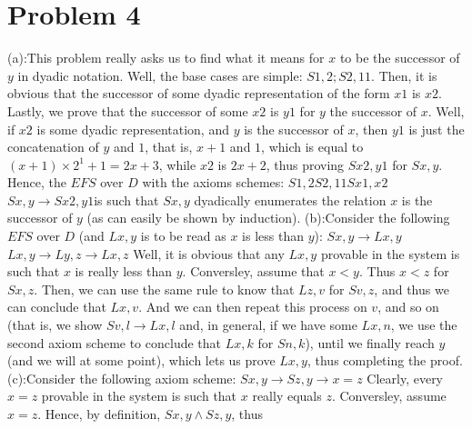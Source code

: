 \documentclass{article}
\theoremstyle{definition}
\begin{document}
\section*{Problem 4}
(a):\newline This problem really asks us to find what it means for $x$ to be the successor of $y$ in dyadic notation. Well, the base cases are simple: 
$S 1,2; S 2,11$. Then, it is obvious that the successor of some dyadic representation of the form $x1$ is $x2$. Lastly, we prove that the successor of 
some $x2$ is $y1$ for $y$ the successor of $x$. Well, if $x2$ is some dyadic representation, and $y$ is the successor of $x$, then $y1$ is just the 
concatenation of $y$ and $1$, that is, $x+1$ and $1$, which is equal to $(x+1)\times 2^1+1=2x+3$, while $x2$ is $2x+2$, thus proving $S x2, y1$ for 
$S x,y$. Hence, the $EFS$ over $D$ with the axioms schemes:\newline
$S1,2$\newline $S2,11$\newline $Sx1,x2$\newline $Sx,y\rightarrow Sx2,y1$\newline is such that $Sx,y$ dyadically enumerates the relation $x$ is the successor 
of $y$
(as can easily be shown by induction).
\newline (b):\newline Consider the following $EFS$ over $D$ (and $Lx,y$ is to be read as $x$ is less than $y$):\newline 
$Sx,y\rightarrow Lx,y$\newline $Lx,y\rightarrow Ly,z\rightarrow Lx,z$\newline
Well, it is obvious that any $Lx,y$ provable in the system is such that $x$ is really less than $y$. Conversley, assume that $x<y$. Thus $x<z$ for $Sx,z$.
Then, we can use the same rule to know that $Lz,v$ for $Sv,z$, and thus we can conclude that $Lx,v$. And we can then repeat this process on $v$, and so on
(that is, we show $Sv,l\rightarrow Lx,l$ and, in general, if we have some $Lx,n$, we use the second axiom scheme to conclude that $Lx,k$ for $Sn,k$),
until we finally reach $y$ (and we will at some point), which lets us prove $Lx,y$, thus completing the proof.\newline
(c):\newline Consider the following axiom scheme:\newline
$Sx,y\rightarrow Sz,y\rightarrow x=z$\newline
Clearly, every $x=z$ provable in the system is such that $x$ really equals $z$. Conversley, assume $x=z$. Hence, by definition, $Sx,y\wedge Sz,y$, thus 
\end{document}
